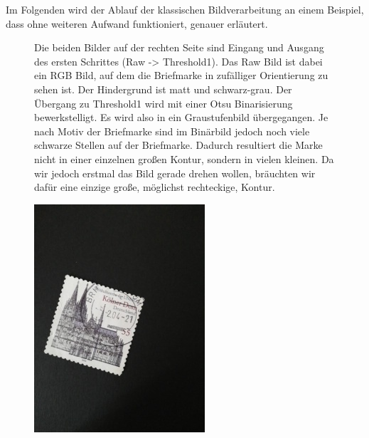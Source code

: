\documentclass[12pt,toc=bib,toc=listof]{scrreprt}
\begin{document}
Im Folgenden wird der Ablauf der klassischen Bildverarbeitung an einem Beispiel, dass ohne weiteren Aufwand funktioniert, genauer erläutert.
\begin{figure}[!ht]

\begin{minipage}[t]{.75\linewidth}
Die beiden Bilder auf der rechten Seite sind Eingang und Ausgang des ersten Schrittes (Raw -> Threshold1). Das Raw Bild ist dabei ein RGB Bild, auf dem die Briefmarke in zufälliger Orientierung zu sehen ist. Der Hindergrund ist matt und schwarz-grau. Der Übergang zu Threshold1 wird mit einer Otsu Binarisierung bewerkstelligt. Es wird also in ein Graustufenbild übergegangen. Je nach Motiv der Briefmarke sind im Binärbild jedoch noch viele schwarze Stellen auf der Briefmarke. Dadurch resultiert die Marke nicht in einer einzelnen großen Kontur, sondern in vielen kleinen. Da wir jedoch erstmal das Bild gerade drehen wollen, bräuchten wir dafür eine einzige große, möglichst rechteckige, Kontur.
\end{minipage}
\hfill
\begin{minipage}[t]{.2\linewidth}
  \strut\vspace*{-\baselineskip}\newline\includegraphics[width=\linewidth]{./bilder/start_dom}

\end{minipage}
\end{figure}
\end{document}
